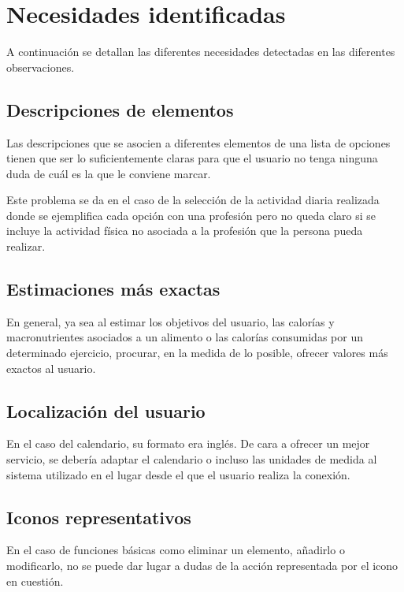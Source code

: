 \documentclass[a4paper]{article}
\begin{document}
\section{Necesidades identificadas}

A continuación se detallan las diferentes necesidades detectadas en las diferentes observaciones.

	\subsection{Descripciones de elementos}
	
	Las descripciones que se asocien a diferentes elementos de una lista de opciones tienen que ser lo suficientemente claras para que el usuario no tenga ninguna duda de cuál es la que le conviene marcar.
	
	Este problema se da en el caso de la selección de la actividad diaria realizada donde se ejemplifica cada opción con una profesión pero no queda claro si se incluye la actividad física no asociada a la profesión que la persona pueda realizar.
	
	\subsection{Estimaciones más exactas}
	
	En general, ya sea al estimar los objetivos del usuario, las calorías y macronutrientes asociados a un alimento o las calorías consumidas por un determinado ejercicio, procurar, en la medida de lo posible, ofrecer valores más exactos al usuario.
	
	\subsection{Localización del usuario}
	
	En el caso del calendario, su formato era inglés. De cara a ofrecer un mejor servicio, se debería adaptar el calendario o incluso las unidades de medida al sistema utilizado en el lugar desde el que el usuario realiza la conexión.
	
	\subsection{Iconos representativos}
	
	En el caso de funciones básicas como eliminar un elemento, añadirlo o modificarlo, no se puede dar lugar a dudas de la acción representada por el icono en cuestión.
	
\end{document}
